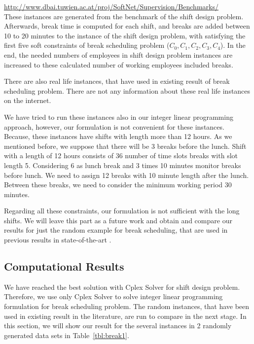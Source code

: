 \url{http://www.dbai.tuwien.ac.at/proj/SoftNet/Supervision/Benchmarks/} \\

These instances are generated from the benchmark of the shift design problem. Afterwards, break time is computed for each shift, and breaks are added between 10 to 20 minutes to the instance of the shift design problem, with satisfying the first five soft constraints of break scheduling problem ($C_0, C_1, C_2, C_3, C_4$). In the end, the needed numbers of employees in shift design problem instances are increased to these calculated number of working employees included breaks.

There are also real life instances, that have used in existing result of break scheduling problem. There are not any information about these real life instances on the internet. 

We have tried to run these instances also in our integer linear programming approach, however, our formulation is not convenient for these instances. Because, these instances have shifts with length more than 12 hours. As we mentioned before, we suppose that there will be 3 breaks before the lunch. Shift with a length of 12 hours consists of 36 number of time slots breaks with slot length 5. Considering 6 as lunch break and 3 times 10 minutes monitor breaks before lunch. We need to assign 12 breaks with 10 minute length after the lunch. Between these breaks, we need to consider the minimum working period 30 minutes. 

Regarding all these constraints, our formulation is not sufficient with the long shifts. We will leave this part as a future work and obtain and compare our results for just the random example for break scheduling, that are used in previous results in state-of-the-art  \cite{li:2014:widl} \cite{li:2010:beer}. 

\subsection{Computational Results }

We have reached the best solution with Cplex Solver for shift design problem. Therefore, we use only Cplex Solver to solve integer linear programming formulation for break scheduling problem. The random instances, that have been used in existing result in the literature, are run to compare in the next stage. In this section, we will show our result for the several instances in 2 randomly generated data sets in Table~\ref{tbl:break1}.

